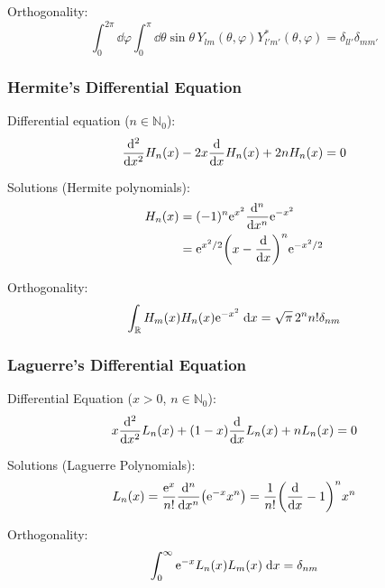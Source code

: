 			\noindent
			Orthogonality:
			\begin{equation}
				\int_0^{2\pi}\dd\varphi \int_0^{\pi}\dd\theta \sin\theta\, Y_{lm}(\theta,\varphi) Y^{*}_{l'm'}(\theta,\varphi) = 	\delta_{ll'}\delta_{mm'}
			\end{equation}

		\subsubsection{Hermite's Differential Equation}
			\noindent
			Differential equation ($n\in\mathbb{N}_0$):
			\begin{equation}
				\dv[2]{x} H_n(x) -2x\dv{x} H_n(x) +2 n H_n(x)=0
			\end{equation}

			\noindent
			Solutions (Hermite polynomials):
			\begin{equation} \label{Eq:HermitePolynomials}
				\begin{aligned}
					H_n(x) &= (-1)^n \mathrm{e}^{x^2} \dv[n]{x} \mathrm{e}^{-x^2} \\
					&= \mathrm{e}^{x^2/2}\qty(x-\dv{x})^n \mathrm{e}^{-x^2/2} \\
				\end{aligned}
			\end{equation}

			\noindent
			Orthogonality:
			\begin{equation}
				\int_{\mathbb{R}} H_m(x) H_n(x) \mathrm{e}^{-x^2}\;\dd x = \sqrt{\pi}\,2^n n!\delta_{nm}
			\end{equation}

		\subsubsection{Laguerre's Differential Equation}
			\noindent
			Differential Equation ($x>0$, $n\in\mathbb{N}_0$):
			\begin{equation}
				x\dv[2]{x}L_n(x) +(1-x)\dv{x}L_n(x) + nL_n(x) = 0
			\end{equation}

			\noindent
			Solutions (Laguerre Polynomials):
			\begin{equation}
				L_n(x) = \frac{\mathrm{e}^x}{n!}\dv[n]{x}(\mathrm{e}^{-x} x^n) = \frac{1}{n!} \qty(\dv{x}-1)^n x^n
			\end{equation}

			\noindent
			Orthogonality:
			\begin{equation}
				\int_0^\infty \mathrm{e}^{-x} L_n(x) L_m(x)\;\dd x = \delta_{nm}
			\end{equation}

